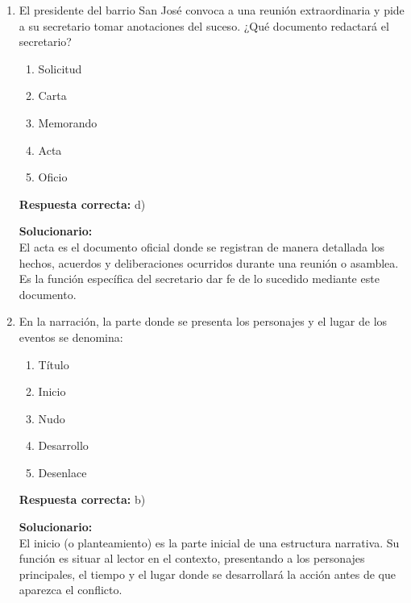 \begin{enumerate}
\vspace{6mm}

\item El presidente del barrio San José convoca a una reunión extraordinaria y pide a su secretario tomar anotaciones del suceso.
¿Qué documento redactará el secretario?

\begin{enumerate}[label=\alph*)]
	\item Solicitud
	\item Carta
	\item Memorando
	\item Acta
	\item Oficio
\end{enumerate}

\textbf{Respuesta correcta:} d)

\vspace{2mm}
\textbf{Solucionario:}\\
El acta es el documento oficial donde se registran de manera detallada los hechos, acuerdos y deliberaciones ocurridos durante una reunión o asamblea. Es la función específica del secretario dar fe de lo sucedido mediante este documento.

\vspace{6mm}

\item En la narración, la parte donde se presenta los personajes y el lugar de los eventos se denomina:

\begin{enumerate}[label=\alph*)]
	\item Título
	\item Inicio
	\item Nudo
	\item Desarrollo
	\item Desenlace
\end{enumerate}

\textbf{Respuesta correcta:} b)

\vspace{2mm}
\textbf{Solucionario:}\\
El inicio (o planteamiento) es la parte inicial de una estructura narrativa. Su función es situar al lector en el contexto, presentando a los personajes principales, el tiempo y el lugar donde se desarrollará la acción antes de que aparezca el conflicto.

\vspace{6mm}
	
\end{enumerate}






